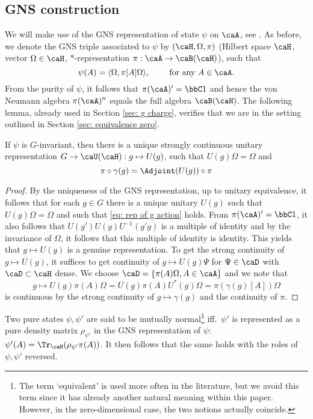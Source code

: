 \subsection{GNS construction}\label{sec: representations}
We will make use of the GNS representation of state $\psi$ on $\caA$, see \cite{BratRob}. As before, we denote the GNS triple associated to $\psi$ by   $(\caH,\Omega,\pi)$ 
(Hilbert space $\caH$,  vector $\Omega\in\caH$,  $*$-representation  $\pi:\caA\to\caB(\caH)$), such that 
$$\psi(A)=\langle\Omega, \pi[A]\Omega\rangle, \qquad \text{ for any $A\in\caA$}.  $$     From the purity of $\psi$, it follows that $\pi(\caA)'=\bbC 1$ and hence the von Neumann algebra $\pi(\caA)''$ equals the full algebra $\caB(\caH)$. The following lemma, already used in Section \ref{sec: g charge}, verifies that we are in the setting outlined in Section \ref{sec: equivalence zero}. 
\begin{lemma}\label{lem: gns} If $\psi$ is $G$-invariant, then there is a unique strongly continuous unitary representation $G\to \caU(\caH): g\mapsto U(g)$, such that $U(g)\Omega=\Omega$ and
	\begin{equation} \label{eq: rep of g action}
		\pi\circ \gamma(g)= \Adjoint(U(g))\circ \pi
	\end{equation}
\end{lemma} 
\begin{proof}
	By the uniqueness of the GNS representation, up to unitary equivalence, it follows that for each $g\in G$ there is a unique unitary $U(g)$ such that $U(g)\Omega=\Omega$ and such that \eqref{eq: rep of g action} holds. From $\pi(\caA)'=\bbC 1$, it also follows that $U(g')U(g)U^{-1}(g'g)$ is a multiple of identity and by the invariance of $\Omega$, it follows that this multiple of identity is identity.
	This yields that $g\mapsto U(g)$ is a genuine representation. 
	To get the strong continuity of $g\mapsto U(g)$, it suffices to get continuity of $g \mapsto U(g)\Psi$ for $\Psi\in \caD$ with $\caD\subset \caH$ dense. We choose $\caD=\{\pi(A)\Omega, A \in \caA\}$ and we note that 
	$$
	g\mapsto U(g)\pi(A)\Omega =  U(g)\pi(A)U^*(g)\Omega =  \pi(\gamma(g)[A])\Omega 
	$$
	is continuous by the strong continuity of $g\mapsto \gamma(g)$ and the continuity of $\pi$. 
\end{proof}
Two pure states $\psi,\psi'$ are said to be mutually normal\footnote{The term `equivalent' is used more often in the literature, but we avoid this term since it has already another natural meaning within this paper. However, in the zero-dimensional case, the two notions actually coincide.} iff.\  $\psi'$ is represented as a pure density matrix $\rho_{\psi'}$ in the GNS representation of $\psi$: $\psi'(A) = \Tr_\caH(\rho_{\psi'}\pi(A))$. It then follows that the same holds with the roles of $\psi,\psi'$ reversed. 

